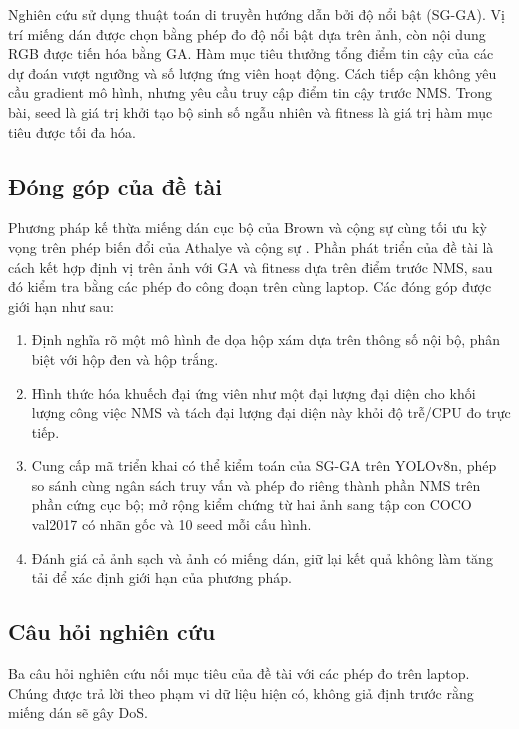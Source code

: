 \documentclass[a4paper,fleqn]{cas-dc}
\begin{document}
Nghiên cứu sử dụng thuật toán di truyền hướng dẫn bởi độ nổi bật (SG-GA). Vị trí miếng dán được chọn bằng phép đo độ nổi bật dựa trên ảnh, còn nội dung RGB được tiến hóa bằng GA. Hàm mục tiêu thưởng tổng điểm tin cậy của các dự đoán vượt ngưỡng và số lượng ứng viên hoạt động. Cách tiếp cận không yêu cầu gradient mô hình, nhưng yêu cầu truy cập điểm tin cậy trước NMS. Trong bài, seed là giá trị khởi tạo bộ sinh số ngẫu nhiên và fitness là giá trị hàm mục tiêu được tối đa hóa.

\subsection{Đóng góp của đề tài}

Phương pháp kế thừa miếng dán cục bộ của Brown và cộng sự cùng tối ưu kỳ vọng trên phép biến đổi của Athalye và cộng sự \cite{brown2017,athalye2018}. Phần phát triển của đề tài là cách kết hợp định vị trên ảnh với GA và fitness dựa trên điểm trước NMS, sau đó kiểm tra bằng các phép đo công đoạn trên cùng laptop. Các đóng góp được giới hạn như sau:

\begin{enumerate}[leftmargin=*]
    \item Định nghĩa rõ một mô hình đe dọa hộp xám dựa trên thông số nội bộ, phân biệt với hộp đen và hộp trắng.
    \item Hình thức hóa khuếch đại ứng viên như một đại lượng đại diện cho khối lượng công việc NMS và tách đại lượng đại diện này khỏi độ trễ/CPU đo trực tiếp.
    \item Cung cấp mã triển khai có thể kiểm toán của SG-GA trên YOLOv8n, phép so sánh cùng ngân sách truy vấn và phép đo riêng thành phần NMS trên phần cứng cục bộ; mở rộng kiểm chứng từ hai ảnh sang tập con COCO val2017 có nhãn gốc và 10 seed mỗi cấu hình.
    \item Đánh giá cả ảnh sạch và ảnh có miếng dán, giữ lại kết quả không làm tăng tải để xác định giới hạn của phương pháp.
\end{enumerate}

\subsection{Câu hỏi nghiên cứu}

Ba câu hỏi nghiên cứu nối mục tiêu của đề tài với các phép đo trên laptop. Chúng được trả lời theo phạm vi dữ liệu hiện có, không giả định trước rằng miếng dán sẽ gây DoS.
\end{document}
